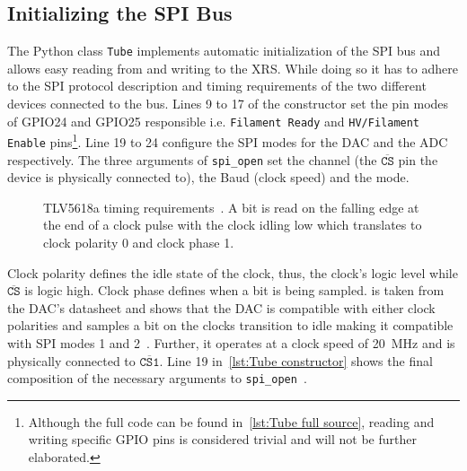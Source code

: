         \subsection{Initializing the SPI Bus}\label{sec:init spi bus}
            The Python class \texttt{Tube} implements automatic initialization of the SPI bus and allows easy reading from and writing to the XRS.
            While doing so it has to adhere to the SPI protocol description and timing requirements of the two different devices connected to the bus.
            Lines 9 to 17 of the constructor set the pin modes of GPIO24 and GPIO25 responsible i.e. \texttt{Filament Ready} and \texttt{HV/Filament Enable} pins\footnote{Although the full code can be found in~\cref{lst:Tube full source}, reading and writing specific GPIO pins is considered trivial and will not be further elaborated.}.
            Line 19 to 24 configure the SPI modes for the DAC and the ADC respectively.
            The three arguments of \texttt{spi\_open} set the channel (the \(\overline{\texttt{CS}}\) pin the device is physically connected to), the Baud (clock speed) and the mode.

            \begin{figure}[h]
                \centering
                
                \caption[TLV5618a timing requirements]{TLV5618a timing requirements~\cite{Manual.DAC.TLV5618A}. A bit is read on the falling edge at the end of a clock pulse with the clock idling low which translates to clock polarity 0 and clock phase 1.}
                \label{fig:tlv5618a timing req}
            \end{figure}\par\medskip

            Clock polarity defines the idle state of the clock, thus, the clock's logic level while \(\overline{\texttt{CS}}\) is logic high.
            Clock phase defines when a bit is being sampled.
             is taken from the DAC's datasheet and shows that the DAC is compatible with either clock polarities and samples a bit on the clocks transition to idle making it compatible with SPI modes 1 and 2~\cite{Manual.IntroductionToSPIInterface.Dhaker.SPI}.
            Further, it operates at a clock speed of \qty{20}{\mega\hertz} and is physically connected to \(\overline{\texttt{CS1}}\).
            Line 19 in~\cref{lst:Tube constructor} shows the final composition of the necessary arguments to \texttt{spi\_open}~\cite{Manual.PigpioLibrary}.\par\medskip

